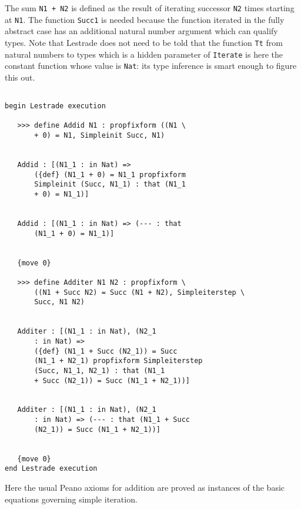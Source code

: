 \documentclass[12pt]{article}
\begin{document}
The sum {\tt N1 + N2} is defined as the result of iterating successor {\tt N2} times starting at {\tt N1}.  The function {\tt Succ1} is needed because the function iterated in the fully abstract case
has an additional natural number argument which can qualify types.  Note that Lestrade does not need to be told that the function {\tt Tt} from natural numbers to types which is a hidden parameter of {\tt Iterate} is here the constant function whose
value is {\tt Nat}:  its type inference is smart enough to figure this out.

\begin{verbatim}

begin Lestrade execution

   >>> define Addid N1 : propfixform ((N1 \
       + 0) = N1, Simpleinit Succ, N1)


   Addid : [(N1_1 : in Nat) => 
       ({def} (N1_1 + 0) = N1_1 propfixform 
       Simpleinit (Succ, N1_1) : that (N1_1 
       + 0) = N1_1)]


   Addid : [(N1_1 : in Nat) => (--- : that 
       (N1_1 + 0) = N1_1)]


   {move 0}

   >>> define Additer N1 N2 : propfixform \
       ((N1 + Succ N2) = Succ (N1 + N2), Simpleiterstep \
       Succ, N1 N2)


   Additer : [(N1_1 : in Nat), (N2_1 
       : in Nat) => 
       ({def} (N1_1 + Succ (N2_1)) = Succ 
       (N1_1 + N2_1) propfixform Simpleiterstep 
       (Succ, N1_1, N2_1) : that (N1_1 
       + Succ (N2_1)) = Succ (N1_1 + N2_1))]


   Additer : [(N1_1 : in Nat), (N2_1 
       : in Nat) => (--- : that (N1_1 + Succ 
       (N2_1)) = Succ (N1_1 + N2_1))]


   {move 0}
end Lestrade execution
\end{verbatim}

Here the usual Peano axioms for addition are proved as instances of the basic equations governing simple iteration.
\end{document}
